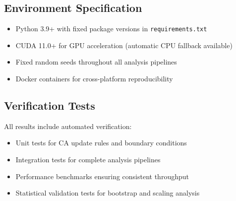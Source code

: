 \documentclass[twocolumn,showpacs,preprintnumbers,amsmath,amssymb,prb]{revtex4-2}
\begin{document}
\subsection{Environment Specification}
\begin{itemize}
\item Python 3.9+ with fixed package versions in \texttt{requirements.txt}
\item CUDA 11.0+ for GPU acceleration (automatic CPU fallback available)
\item Fixed random seeds throughout all analysis pipelines
\item Docker containers for cross-platform reproducibility
\end{itemize}

\subsection{Verification Tests}
All results include automated verification:
\begin{itemize}
\item Unit tests for CA update rules and boundary conditions
\item Integration tests for complete analysis pipelines  
\item Performance benchmarks ensuring consistent throughput
\item Statistical validation tests for bootstrap and scaling analysis
\end{itemize}
\end{document}

